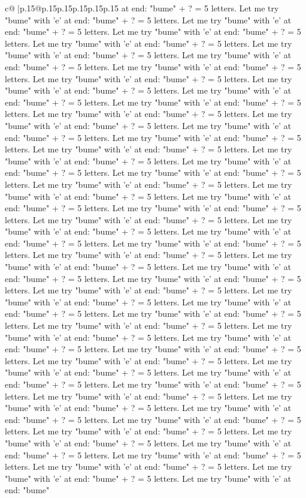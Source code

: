 \documentclass{article}
\begin{document}
{\begin{supertabular}{c@{$\;$}|p{.15\linewidth}@{}p{.15\linewidth}p{.15\linewidth}p{.15\linewidth}p{.15\linewidth}p{.15\linewidth}}
{{{at end: "bume" + ? = 5 letters. Let me try "bume" with 'e' at end: "bume" + ? = 5 letters. Let me try "bume" with 'e' at end: "bume" + ? = 5 letters. Let me try "bume" with 'e' at end: "bume" + ? = 5 letters. Let me try "bume" with 'e' at end: "bume" + ? = 5 letters. Let me try "bume" with 'e' at end: "bume" + ? = 5 letters. Let me try "bume" with 'e' at end: "bume" + ? = 5 letters. Let me try "bume" with 'e' at end: "bume" + ? = 5 letters. Let me try "bume" with 'e' at end: "bume" + ? = 5 letters. Let me try "bume" with 'e' at end: "bume" + ? = 5 letters. Let me try "bume" with 'e' at end: "bume" + ? = 5 letters. Let me try "bume" with 'e' at end: "bume" + ? = 5 letters. Let me try "bume" with 'e' at end: "bume" + ? = 5 letters. Let me try "bume" with 'e' at end: "bume" + ? = 5 letters. Let me try "bume" with 'e' at end: "bume" + ? = 5 letters. Let me try "bume" with 'e' at end: "bume" + ? = 5 letters. Let me try "bume" with 'e' at end: "bume" + ? = 5 letters. Let me try "bume" with 'e' at end: "bume" + ? = 5 letters. Let me try "bume" with 'e' at end: "bume" + ? = 5 letters. Let me try "bume" with 'e' at end: "bume" + ? = 5 letters. Let me try "bume" with 'e' at end: "bume" + ? = 5 letters. Let me try "bume" with 'e' at end: "bume" + ? = 5 letters. Let me try "bume" with 'e' at end: "bume" + ? = 5 letters. Let me try "bume" with 'e' at end: "bume" + ? = 5 letters. Let me try "bume" with 'e' at end: "bume" + ? = 5 letters. Let me try "bume" with 'e' at end: "bume" + ? = 5 letters. Let me try "bume" with 'e' at end: "bume" + ? = 5 letters. Let me try "bume" with 'e' at end: "bume" + ? = 5 letters. Let me try "bume" with 'e' at end: "bume" + ? = 5 letters. Let me try "bume" with 'e' at end: "bume" + ? = 5 letters. Let me try "bume" with 'e' at end: "bume" + ? = 5 letters. Let me try "bume" with 'e' at end: "bume" + ? = 5 letters. Let me try "bume" with 'e' at end: "bume" + ? = 5 letters. Let me try "bume" with 'e' at end: "bume" + ? = 5 letters. Let me try "bume" with 'e' at end: "bume" + ? = 5 letters. Let me try "bume" with 'e' at end: "bume" + ? = 5 letters. Let me try "bume" with 'e' at end: "bume" + ? = 5 letters. Let me try "bume" with 'e' at end: "bume" + ? = 5 letters. Let me try "bume" with 'e' at end: "bume" + ? = 5 letters. Let me try "bume" with 'e' at end: "bume" + ? = 5 letters. Let me try "bume" with 'e' at end: "bume" + ? = 5 letters. Let me try "bume" with 'e' at end: "bume" + ? = 5 letters. Let me try "bume" with 'e' at end: "bume" + ? = 5 letters. Let me try "bume" with 'e' at end: "bume" + ? = 5 letters. Let me try "bume" with 'e' at end: "bume" + ? = 5 letters. Let me try "bume" with 'e' at end: "bume" + ? = 5 letters. Let me try "bume" with 'e' at end: "bume" + ? = 5 letters. Let me try "bume" with 'e' at end: "bume" + ? = 5 letters. Let me try "bume" with 'e' at end: "bume" + ? = 5 letters. Let me try "bume" with 'e' at end: "bume" + ? = 5 letters. Let me try "bume" with 'e' at end: "bume" + ? = 5 letters. Let me try "bume" with 'e' at end: "bume" + ? = 5 letters. Let me try "bume" with 'e' at end: "bume" + ? = 5 letters. Let me try "bume" with 'e' at end: "bume" + ? = 5 letters. Let me try "bume" with 'e' at end: "bume" }}}
\end{supertabular}}
\end{document}
